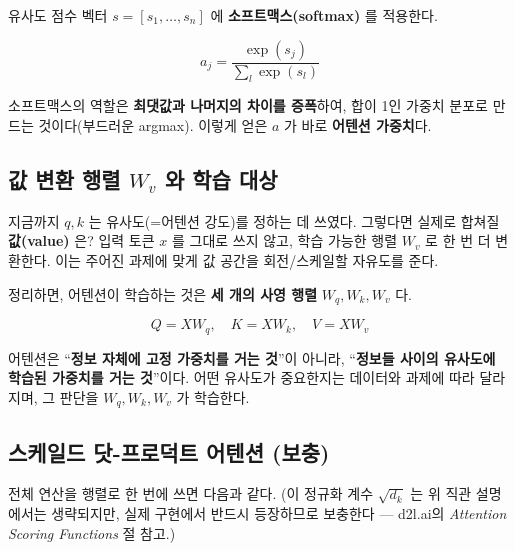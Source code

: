 \documentclass[
  korean,
]{article}
\begin{document}
유사도 점수 벡터 \(s = [s_1, \dots, s_n]\) 에
\textbf{소프트맥스(softmax)} 를 적용한다.

\[
a_j = \frac{\exp(s_j)}{\sum_{l} \exp(s_l)}
\]

소프트맥스의 역할은 \textbf{최댓값과 나머지의 차이를 증폭}하여, 합이 1인
가중치 분포로 만드는 것이다(부드러운 argmax). 이렇게 얻은 \(a\) 가 바로
\textbf{어텐션 가중치}다.

\subsection{\texorpdfstring{값 변환 행렬 \(W_v\) 와 학습
대상}{값 변환 행렬 W\_v 와 학습 대상}}\label{uxac12-uxbcc0uxd658-uxd589uxb82c-w_v-uxc640-uxd559uxc2b5-uxb300uxc0c1}

지금까지 \(q, k\) 는 유사도(=어텐션 강도)를 정하는 데 쓰였다. 그렇다면
실제로 합쳐질 \textbf{값(value)} 은? 입력 토큰 \(x\) 를 그대로 쓰지
않고, 학습 가능한 행렬 \(W_v\) 로 한 번 더 변환한다. 이는 주어진 과제에
맞게 값 공간을 회전/스케일할 자유도를 준다.

정리하면, 어텐션이 학습하는 것은 \textbf{세 개의 사영 행렬}
\(W_q, W_k, W_v\) 다.

\[
Q = X W_q,\quad K = X W_k,\quad V = X W_v
\]

\begin{tcolorbox}[enhanced jigsaw, arc=.35mm, bottomrule=.15mm, bottomtitle=1mm, breakable, colback=white, colbacktitle=quarto-callout-important-color!10!white, colframe=quarto-callout-important-color-frame, coltitle=black, left=2mm, leftrule=.75mm, opacityback=0, opacitybacktitle=0.6, rightrule=.15mm, title=\textcolor{quarto-callout-important-color}{\faExclamation}\hspace{0.5em}{어텐션의 본질}, titlerule=0mm, toprule=.15mm, toptitle=1mm]

어텐션은 ``\textbf{정보 자체에 고정 가중치를 거는 것}''이 아니라,
``\textbf{정보들 사이의 유사도에 학습된 가중치를 거는 것}''이다. 어떤
유사도가 중요한지는 데이터와 과제에 따라 달라지며, 그 판단을
\(W_q, W_k, W_v\) 가 학습한다.

\end{tcolorbox}

\subsection{스케일드 닷-프로덕트 어텐션 (보충)}\label{sec-scaled}

전체 연산을 행렬로 한 번에 쓰면 다음과 같다. (이 정규화 계수
\(\sqrt{d_k}\) 는 위 직관 설명에서는 생략되지만, 실제 구현에서 반드시
등장하므로 보충한다 --- d2l.ai의 \emph{Attention Scoring Functions} 절
참고.)
\end{document}
